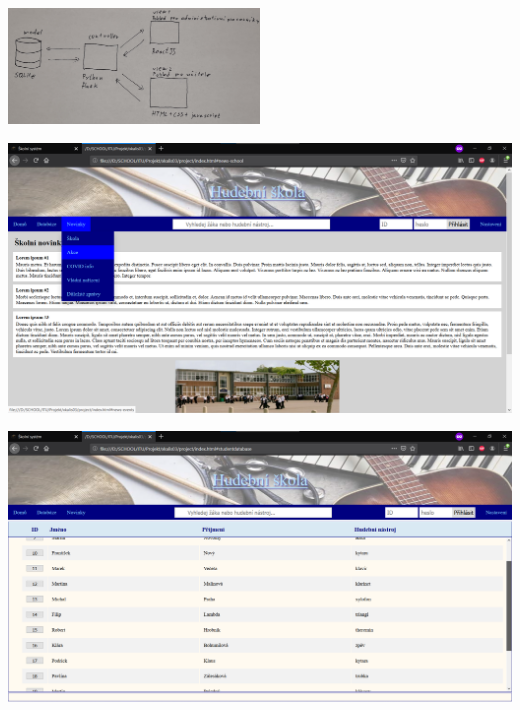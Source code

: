 \documentclass[a4paper, 11pt, twocolumn]{article}
\begin{document}
	\vspace*{\fill}
	\clearpage


	\onecolumn
	\begin{center}
	\includegraphics[width=0.5\textwidth]{scheme.jpg}
	\end{center}


	\vspace*{\fill}
	\clearpage


	\par\vspace*{0.8cm}
	\par\vspace*{0.4cm}
	\begin{center}
	\includegraphics[width=1\textwidth]{teachers_dropdown.png}
	\end{center}
	\vspace*{\fill}
	\begin{center}
	\includegraphics[width=1\textwidth]{teachers_search_1.png}
	\end{center}
\end{document}
